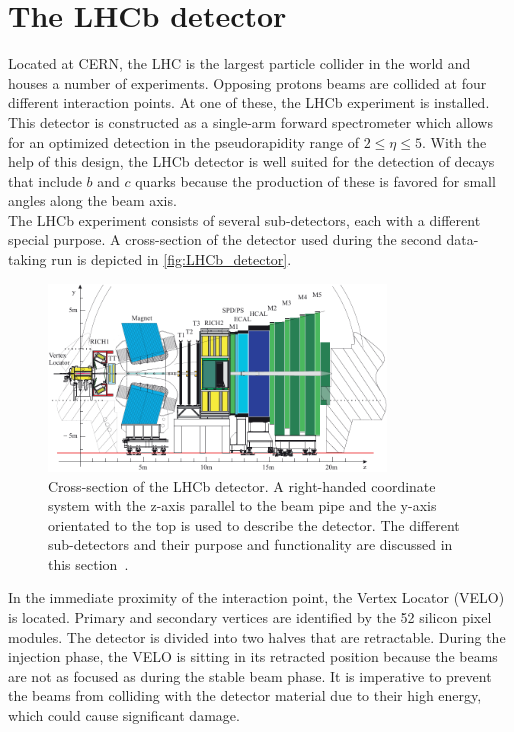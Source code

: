 \section{The LHCb detector}
\label{sec:Detector}
Located at CERN, the LHC is the largest particle collider in the world and houses a number of experiments. Opposing protons beams are collided at four different
interaction points. At one of these, the LHCb experiment is installed. This detector is constructed as a single-arm forward spectrometer which allows for an optimized detection in the pseudorapidity range
of $2≤\eta≤5$. With the help of this design, the LHCb detector is well suited for the detection of decays that include $b$ and $c$ quarks because the production of these is favored for small angles along the
beam axis. \\
The LHCb experiment consists of several sub-detectors, each with a different special purpose. A cross-section of the detector used during the second data-taking run is depicted in \autoref{fig:LHCb_detector}.
\begin{figure}
    \centering
    \includegraphics[width=0.8\textwidth]{content/pics/LHCb_detector.pdf}
    \caption{Cross-section of the LHCb detector. A right-handed coordinate system with the z-axis parallel to the beam pipe and the y-axis orientated to the top is used to describe the detector.%
    The different sub-detectors and their purpose and functionality are discussed in this section~\cite{LHCb_detector}.}
    \label{fig:LHCb_detector}
\end{figure}
In the immediate proximity of the interaction point, the Vertex Locator (VELO) is located. Primary and secondary vertices are identified by the 52 silicon pixel modules. The detector is divided into two
halves that are retractable. During the injection phase, the VELO is sitting in its retracted position because the beams are not as focused as during the stable beam phase.
It is imperative to prevent the beams from colliding with the detector material due to their high energy, which could cause significant damage.
